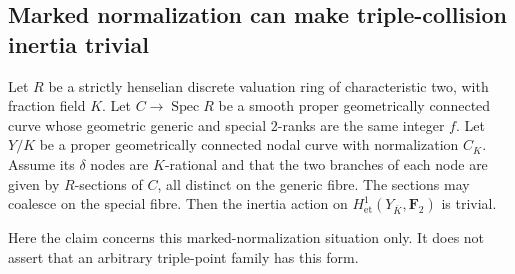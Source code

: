 \subsection{Marked normalization can make triple-collision inertia trivial}

\begin{proposition}
\label{prop:root-marked-normalization-inertia}
Let $R$ be a strictly henselian discrete valuation ring of characteristic
two, with fraction field $K$. Let $C\to\operatorname{Spec}R$ be a smooth
proper geometrically connected curve whose geometric generic and special
$2$-ranks are the same integer $f$. Let $Y/K$ be a proper geometrically
connected nodal curve with normalization $C_K$. Assume its $\delta$ nodes
are $K$-rational and that the two branches of each node are given by
$R$-sections of $C$, all distinct on the generic fibre. The sections may
coalesce on the special fibre. Then the inertia action on
$H^1_{\mathrm{et}}(Y_{\overline K},\mathbf F_2)$ is trivial.

Here the claim concerns this marked-normalization situation only. It does
not assert that an arbitrary triple-point family has this form.

\end{proposition}

